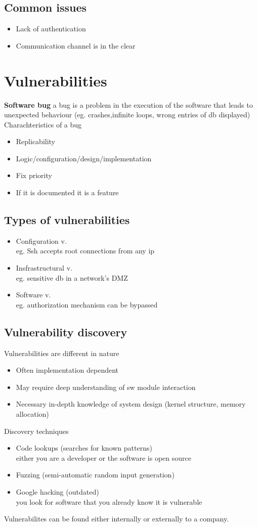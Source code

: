 \documentclass[10pt,a4paper]{book}
\begin{document}
\section{Common issues}
\begin{itemize}
\item Lack of authentication
\item Communication channel is in the clear
\end{itemize}
\chapter{Vulnerabilities}
\textbf{Software bug} a bug is a problem in the execution of the software that leads to unexpected behaviour (eg. crashes,infinite loops, wrong entries of db displayed)\\
Charachteristics of a bug
\begin{itemize}
\item Replicability
\item Logic/configuration/design/implementation
\item Fix priority
\item If it is documented it is a feature
\end{itemize}
\section{Types of vulnerabilities}
\begin{itemize}
\item Configuration v.\\
eg. Ssh accepts root connections from any ip
\item Insfrastructural v.\\
eg. sensitive db in a network's DMZ
\item Software v.\\
eg. authorization mechanism can be bypassed
\end{itemize}
\section{Vulnerability discovery}
Vulnerabilities are different in nature
\begin{itemize}
\item Often implementation dependent
\item May require deep understanding of sw module interaction
\item Necessary in-depth knowledge of system design (kernel structure, memory allocation)
\end{itemize}
Discovery techniques
\begin{itemize}
\item Code lookups (searches for known patterns)\\
either you are a developer or the software is open source
\item Fuzzing (semi-automatic random input generation)
\item Google hacking (outdated)\\
you look for software that you already know it is vulnerable
\end{itemize}
Vulnerabilites can be found either internally or externally to a company.\\
\end{document}
